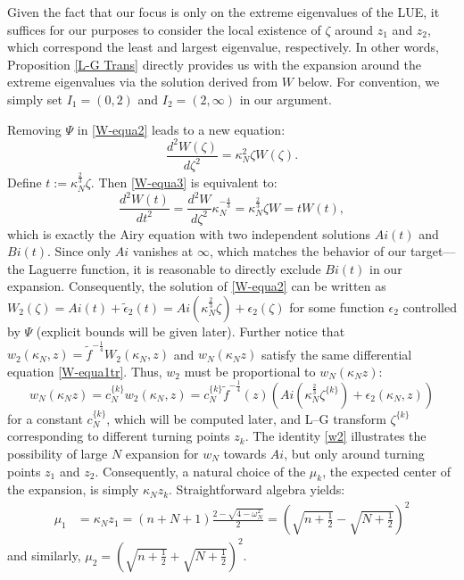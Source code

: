 \documentclass[11pt]{article}
\numberwithin{equation}{section}%
\numberwithin{theorem}{section}
\begin{document}
Given the fact that our focus is only on the extreme eigenvalues of the LUE, it suffices for our purposes to consider the local existence of $\zeta$ around $z_1$ and $z_2$, which correspond the least and largest eigenvalue, respectively. In other words, Proposition \ref{L-G Trans} directly provides us with the expansion around the extreme eigenvalues via the solution derived from $W$ below. For convention, we simply set $I_1=(0,2)$ and $I_2=(2,\infty)$ in our argument.

Removing $\Psi$ in \eqref{W-equa2} leads to a new equation:
\begin{equation}\label{W-equa3}
    \frac{d^2W(\zeta)}{d\zeta^2}=\kappa^2_N\zeta W(\zeta).
\end{equation}
Define $t:=\kappa_N^\frac{2}{3}\zeta$. Then \eqref{W-equa3} is equivalent to:
\begin{equation*}
    \frac{d^2W(t)}{dt^2}=\frac{d^2W}{d\zeta^2}\kappa_N^{-\frac{4}{3}}=\kappa_N^\frac{2}{3}\zeta W=tW(t),
\end{equation*}
which is exactly the Airy equation with two independent solutions $Ai(t)$ and $Bi(t)$. Since only $Ai$ vanishes at $\infty$, which matches the behavior of our target---the Laguerre function, it is reasonable to directly exclude $Bi(t)$ in our expansion. Consequently, the solution of \eqref{W-equa2} can be written as $W_2(\zeta)=Ai(t)+\tilde{{\epsilon}}_2(t)=Ai\left(\kappa_N^\frac{2}{3}\zeta\right)+\epsilon_2(\zeta)$ for some function $\epsilon_2$ controlled by $\Psi$ (explicit bounds will be given later).
Further notice that $w_2(\kappa_N,z)=\tilde{f}^{-\frac{1}{4}}W_2(\kappa_N,z)$ and $w_N(\kappa_Nz)$ satisfy the same differential equation \eqref{W-equa1tr}. Thus, $w_2$ must be proportional to $w_N(\kappa_Nz)$:
\begin{equation}\label{w2}
   w_N(\kappa_Nz)=c^{\{k\}}_{N}w_2(\kappa_N,z)=c^{\{k\}}_{N}\tilde{f}^{-\frac{1}{4}}(z)\left(Ai\left(\kappa_{N}^{\frac{2}{3}}\zeta^{\{k\}}\right)+\epsilon_2(\kappa_N,z)\right)
\end{equation}
for a constant $c^{\{k\}}_{N}$, which will be computed later, and L--G transform $\zeta^{\{k\}}$ corresponding to different turning points $z_k$. The identity \eqref{w2} illustrates the possibility of large $N$ expansion for $w_N$ towards $Ai$, but only around turning points $z_1$ and $z_2$. Consequently, a natural choice of the $\mu_k$, the expected center of the expansion, is simply $\kappa_N z_k$. Straightforward algebra yields:
\begin{equation*}
    \begin{split}
       \mu_1&=\kappa_Nz_1=(n+N+1)\frac{2-\sqrt{4-\omega_N^2}}{2}=\left(\sqrt{n+\frac{1}{2}}-\sqrt{N+\frac{1}{2}}\right)^2
    \end{split}
\end{equation*}
and similarly, $\mu_2=\left(\sqrt{n+\frac{1}{2}}+\sqrt{N+\frac{1}{2}}\right)^2$.
\end{document}
